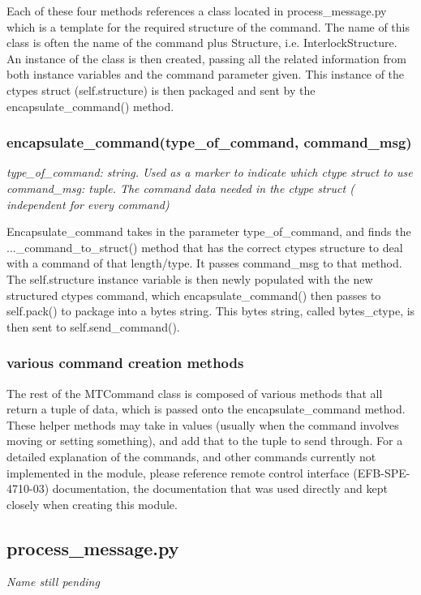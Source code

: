 \documentclass{article}
\begin{document}
Each of these four methods references a class located in process\_message.py which is a template for the required structure of the command. The name of this class is often the name of the command plus Structure, i.e. InterlockStructure. An instance of the class is then created, passing all the related information from both instance variables and the command parameter given. This instance of the ctypes struct (self.structure) is then packaged and sent by the encapsulate\_command() method.


\subsubsection*{encapsulate\_command(type\_of\_command, command\_msg)}
\emph{type\_of\_command: string. Used as a marker to indicate which ctype struct to use}\\
\emph{command\_msg: tuple. The command data needed in the ctype struct ( independent for every command)}
\vspace{10pt}

Encapsulate\_command takes in the parameter type\_of\_command, and finds the ...\_command\_to\_struct() method that has the correct ctypes structure to deal with a command of that length/type. It passes command\_msg to that method. The self.structure instance variable is then newly populated with the new structured ctypes command, which encapsulate\_command() then passes to self.pack() to package into a bytes string. This bytes string, called bytes\_ctype, is then sent to self.send\_command(). 


\subsubsection*{various command creation methods}

The rest of the MTCommand class is composed of various methods that all return a tuple of data, which is passed onto the encapsulate\_command method. These helper methods may take in values (usually when the command involves moving or setting something), and add that to the tuple to send through. For a detailed explanation of the commands, and other commands currently not implemented in the module, please reference remote control interface (EFB-SPE-4710-03)  documentation, the documentation that was used directly and kept closely when creating this module. 
 


\newpage
\subsection{process\_message.py}
\emph{Name still pending}
\vspace{10pt}
\end{document}
